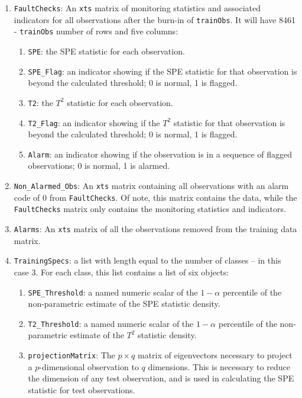 \documentclass{report}\usepackage[]{graphicx}\usepackage[]{color}
\begin{document}
\begin{enumerate}
\item \texttt{FaultChecks}: An \texttt{xts} matrix of monitoring statistics and associated indicators for all observations after the burn-in of \texttt{trainObs}. It will have 8461 - \texttt{trainObs} number of rows and five columns:
	\begin{enumerate}
	\item \texttt{SPE}: the SPE statistic for each observation.
    \item \texttt{SPE\_Flag}: an indicator showing if the SPE statistic for that observation is beyond the calculated threshold; 0 is normal, 1 is flagged.
    \item \texttt{T2}: the $T^2$ statistic for each observation.
    \item \texttt{T2\_Flag}: an indicator showing if the $T^2$ statistic for that observation is beyond the calculated threshold; 0 is normal, 1 is flagged.
    \item \texttt{Alarm}: an indicator showing if the observation is in a sequence of flagged observations; 0 is normal, 1 is alarmed.
	\end{enumerate}
%
\item \texttt{Non\_Alarmed\_Obs}: An \texttt{xts} matrix containing all observations with an alarm code of 0 from \texttt{FaultChecks}. Of note, this matrix contains the data, while the \texttt{FaultChecks} matrix only contains the monitoring statistics and indicators.
%
\item \texttt{Alarms}: An \texttt{xts} matrix of all the observations removed from the training data matrix.
%
\item \texttt{TrainingSpecs}: a list with length equal to the number of classes -- in this case 3. For each class, this list contains a list of six objects:
	\begin{enumerate}
	\item \texttt{SPE\_Threshold}: a named numeric scalar of the $1 - \alpha$ percentile of the non-parametric estimate of the SPE statistic density.
    \item \texttt{T2\_Threshold}: a named numeric scalar of the $1 - \alpha$ percentile of the non-parametric estimate of the $T^2$ statistic density.
    \item \texttt{projectionMatrix}: The $p \times q$ matrix of eigenvectors necessary to project a $p$-dimensional observation to $q$ dimensions. This is necessary to reduce the dimension of any test observation, and is used in calculating the SPE statistic for test observations.

\end{enumerate}
\end{enumerate}
\end{document}
